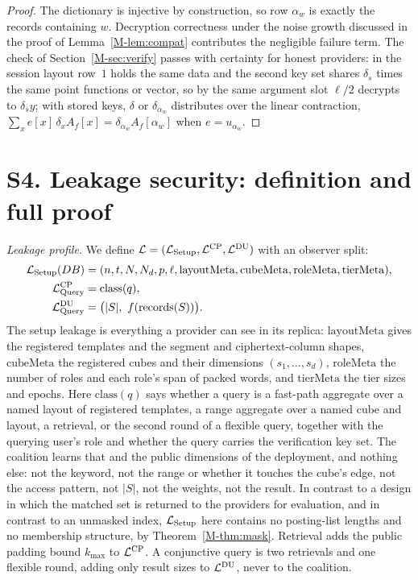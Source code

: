 \documentclass[11pt,a4paper]{article}
\newcommand{\mref}[1]{\ref{M-#1}}
\begin{document}
\begin{proof}
The dictionary is injective by construction, so row $\alpha_w$ is exactly the
records containing $w$. Decryption correctness under the noise growth
discussed in the proof of Lemma~\mref{lem:compat} contributes the negligible
failure term. The check of Section~\mref{sec:verify} passes with certainty for
honest providers: in the session layout row~$1$ holds the same data and the
second key set shares $\delta_s$ times the same point functions or vector, so
by the same argument slot $\ell/2$ decrypts to $\delta_sy$; with stored keys,
$\delta$ or $\delta_{\alpha_w}$ distributes over the linear contraction,
$\sum_x e[x]\,\delta_xA_f[x]=\delta_{\alpha_w}A_f[\alpha_w]$ when
$e=u_{\alpha_w}$. 
\end{proof}

\section*{S4. Leakage security: definition and full proof}

\emph{Leakage profile.} We define
$\mathcal{L}=(\mathcal{L}_{\mathrm{Setup}},\mathcal{L}^{\text{CP}},\mathcal{L}^{\text{DU}})$ with an
observer split:
\begin{align*}
\Leak_{\mathrm{Setup}}(DB) &= (n,t,N,N_d,p,\ell,\mathrm{layoutMeta},\mathrm{cubeMeta},\mathrm{roleMeta},\mathrm{tierMeta}),\\
\Leak^{\text{CP}}_{\mathrm{Query}} &= \mathrm{class}(q),\\
\Leak^{\text{DU}}_{\mathrm{Query}} &= \big(|S|,\ f(\mathrm{records}(S))\big).
\end{align*}
The setup leakage is everything a provider can see in its replica:
$\mathrm{layoutMeta}$ gives the registered templates and the segment and
ciphertext-column shapes, $\mathrm{cubeMeta}$ the registered cubes and their
dimensions $(s_1,\dots,s_d)$, $\mathrm{roleMeta}$ the number of roles and each
role's span of packed words, and $\mathrm{tierMeta}$ the tier sizes and epochs.
Here $\mathrm{class}(q)$ says whether a query is a fast-path aggregate over a
named layout of registered templates, a range aggregate over a named cube and
layout, a retrieval, or the second round of a flexible query, together with
the querying user's role and whether the query carries the verification key
set. The coalition
learns that and the public dimensions of the deployment, and nothing else: not
the keyword, not the range or whether it touches the cube's edge, not the
access pattern, not $|S|$, not the weights, not the result. In contrast to a design in which
the matched set is returned to the providers for evaluation, and in contrast
to an unmasked index, $\mathcal{L}_{\mathrm{Setup}}$ here contains no posting-list
lengths and no membership structure, by Theorem~\mref{thm:mask}. Retrieval adds
the public padding bound $k_{\max}$ to $\mathcal{L}^{\text{CP}}$. A conjunctive
query is two retrievals and one flexible round, adding only result sizes to
$\mathcal{L}^{\text{DU}}$, never to the coalition.
\end{document}

